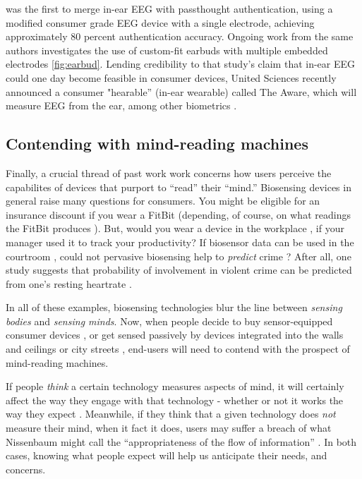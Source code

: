 \documentclass[sigconf]{acmart}
\begin{document}
\cite{curranpassthoughts} was the first to merge in-ear EEG with passthought authentication,
 using a modified consumer grade EEG device with a single electrode, achieving approximately 80 percent authentication accuracy. 
Ongoing work from the same authors investigates the use of custom-fit earbuds with multiple embedded electrodes \ref{fig:earbud}.
Lending credibility to that study's claim that in-ear EEG could one day become feasible in consumer devices,
United Sciences recently announced a consumer "hearable'' (in-ear wearable) called The Aware, which will measure EEG from the ear, among other biometrics \cite{UnitedSciences}.

\subsection{Contending with mind-reading machines}
\label{sec:orgf5790c9}

Finally, a crucial thread of past work work concerns how users perceive the capabilites of devices that purport to ``read'' their ``mind.''
Biosensing devices in general raise many questions for consumers.
You might be eligible for an insurance discount if you wear a FitBit \cite{Bernard2015} (depending, of course, on what readings the FitBit produces \cite{Brain2015}). 
But, would you wear a device in the workplace \cite{solon2015}, if your manager used it to track your productivity?
If biosensor data can be used in the courtroom \cite{Crawford2014}, could not pervasive biosensing help to \emph{predict} crime \cite{Thompson2011}? 
After all, one study suggests that probability of involvement in violent crime can be predicted from one's resting heartrate \cite{Latvala2015}. 

In all of these examples, biosensing technologies blur the line between \emph{sensing bodies} and \emph{sensing minds}. 
Now, when people decide to buy sensor-equipped consumer devices \cite{Stables2016}, or get sensed passively by devices integrated into the walls and ceilings \cite{Adib2015} or city streets \cite{Thrift2014}, end-users will need to contend with the prospect of mind-reading machines.

If people \emph{think} a certain technology measures aspects of mind, it will certainly affect the way they engage with that technology - whether or not it works the way they expect \cite{Ali2014a}. Meanwhile, if they think that a given technology does \emph{not} measure their mind, when it fact it does, users may suffer a breach of what Nissenbaum might call the ``appropriateness of the flow of information'' \cite{Doyle2011}. In both cases, knowing what people expect will help us anticipate their needs, and concerns.
\end{document}
